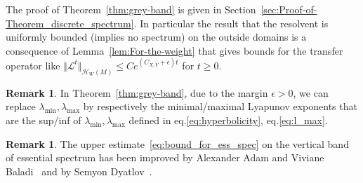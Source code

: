 \documentclass[10pt]{amsart}
\theoremstyle{definition}\newtheorem{defi}[theo]{Definition}\newtheorem{rema}[theo]{Remark}\newtheorem{exam}[theo]{Example}\newtheorem{exem}[theo]{Example}\newtheorem{nota}[theo]{Notation}
\newcommand{\clH}{\mathcal{H}}
\newcommand{\clL}{\mathcal{L}}
\begin{document}
The proof of Theorem~\ref{thm:grey-band} is given in Section~\ref{sec:Proof-of-Theorem_discrete_spectrum}. In particular the result that the resolvent is uniformly bounded (implies no spectrum) on the outside domains is a consequence of Lemma~\ref{lem:For-the-weight} that gives bounds for the transfer operator like $\Vert \clL^{t}\Vert _{\clH _{W}(M)}\leq Ce^{(C_{X,V}+\epsilon)t}$ for $t\geq0$.

\begin{rema}
In Theorem~\ref{thm:grey-band}, due to the margin $\epsilon>0$, we can replace $\lambda_{\min},\lambda_{\max}$ by respectively the minimal/maximal Lyapunov exponents that are the sup/inf of $\lambda_{\min},\lambda_{\max}$ defined in eq.\eqref{eq:hyperbolicity}, eq.\eqref{eq:l_max}.
\end{rema}


\begin{rema}
The upper estimate~\eqref{eq:bound_for_ess_spec} on the vertical band of essential spectrum has been improved by Alexander Adam and Viviane Baladi~\cite[eq.~(52)]{https://doi.org/10.48550/arxiv.1809.04062} and by Semyon Dyatlov~\cite[Theorem~2]{dyatlov_2021_pollicott_ruelle_sobolev}.
\end{rema}
\end{document}
